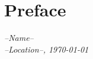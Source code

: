 \section*{Preface}
\label{sec:preface}

\begin{flushleft}
\textit{--Name--}\\
\textit{--Location--, \today}
\end{flushleft}